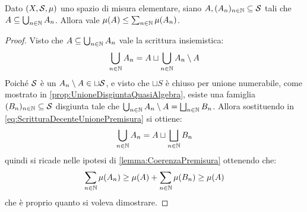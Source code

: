 \begin{lemma}\label{lemma:PiuCheMonotonaPremisura}
	Dato $(X,\S,\mu)$ uno spazio di misura elementare, siano $A,(A_n)_{n\in\N}\subseteq \S$ tali che $A\subseteq\bigcup_{n\in\N}A_n$.
	Allora vale $\mu(A)\le \sum_{n\in\N}\mu(A_n)$.
\end{lemma}
\begin{proof}
	Visto che $A\subseteq\bigcup_{n\in\N}A_n$ vale la scrittura insiemistica:
	\begin{equation}\label{eq:ScritturaDecenteUnionePremisura}
		\bigcup_{n\in\N}A_n=A\sqcup\bigcup_{n\in\N}A_n\setminus A
	\end{equation}
	Poiché $\S$ è un \semiring{} $A_n\setminus A\in \sqcup \S$, e visto che $\sqcup S$ è chiuso per unione numerabile, come mostrato in \cref{prop:UnioneDisgiuntaQuasiAlgebra}, esiste una famiglia $(B_n)_{n\in\N}\subseteq\S$ disgiunta tale che $\bigcup_{n\in\N}A_n\setminus A=\bigsqcup_{n\in\N}B_n$.
	Allora sostituendo in \cref{eq:ScritturaDecenteUnionePremisura} si ottiene:
	\begin{equation*}
		\bigcup_{n\in\N}A_n=A\sqcup\bigsqcup_{n\in\N}B_n
	\end{equation*}
	quindi si ricade nelle ipotesi di \cref{lemma:CoerenzaPremisura} ottenendo che:
	\begin{equation*}
		\sum_{n\in\N}\mu(A_n)\ge \mu(A)+\sum_{n\in\N}\mu(B_n)\ge \mu(A)
	\end{equation*}
	che è proprio quanto si voleva dimostrare.

\end{proof}



